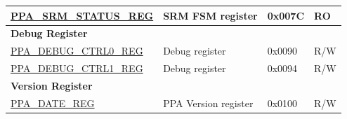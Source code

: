 \begin{longtable}{ | p{6cm} | p{7.2cm} | p{1.3cm} | p{1cm} | }
\hyperref[regdesc:PPASRMSTATUSREG]{PPA\_SRM\_STATUS\_REG} & SRM FSM register & 0x007C & RO \\ \hline
\multicolumn{4}{|l|}{\textbf{Debug Register}} \\ \hline
\hyperref[regdesc:PPADEBUGCTRL0REG]{PPA\_DEBUG\_CTRL0\_REG} & Debug register & 0x0090 & R/W \\ \hline
\hyperref[regdesc:PPADEBUGCTRL1REG]{PPA\_DEBUG\_CTRL1\_REG} & Debug register & 0x0094 & R/W \\ \hline
\multicolumn{4}{|l|}{\textbf{Version Register}} \\ \hline
\hyperref[regdesc:PPADATEREG]{PPA\_DATE\_REG} & PPA Version register & 0x0100 & R/W \\ \hline
\end{longtable}
